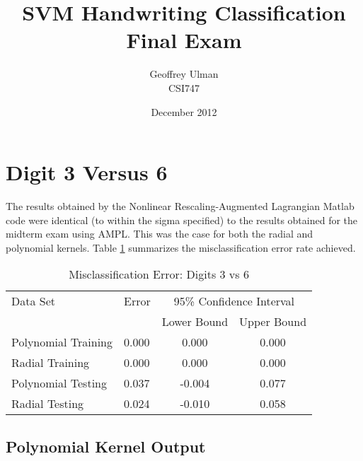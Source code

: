 \documentclass{article}
\begin{document}
\title{SVM Handwriting Classification\\
       Final Exam}
\author{Geoffrey Ulman\\
        CSI747}
\date{December 2012}
\maketitle

\section{Digit 3 Versus 6}\label{digit36}

The results obtained by the Nonlinear Rescaling-Augmented Lagrangian Matlab code were identical (to within the sigma specified) to the results obtained for the midterm exam using AMPL. This was the case for both the radial and polynomial kernels. Table \ref{table1} summarizes the misclassification error rate achieved.

\begin{table}
\caption{Misclassification Error: Digits 3 vs 6}
\begin{center}
\begin{tabular}{llcc}
\toprule
Data Set & Error & \multicolumn{2}{c}{95\% Confidence Interval} \\
\cmidrule(r){3-4}
& & Lower Bound & Upper Bound \\
\midrule
Polynomial Training & 0.000 & 0.000 & 0.000 \\
Radial Training & 0.000 & 0.000 & 0.000 \\
Polynomial Testing & 0.037 & -0.004 & 0.077 \\
Radial Testing & 0.024 & -0.010 & 0.058 \\
\bottomrule
\end{tabular}
\end{center}
\label{table1}
\end{table}

\subsection{Polynomial Kernel Output}\label{poly36}
\end{document}
